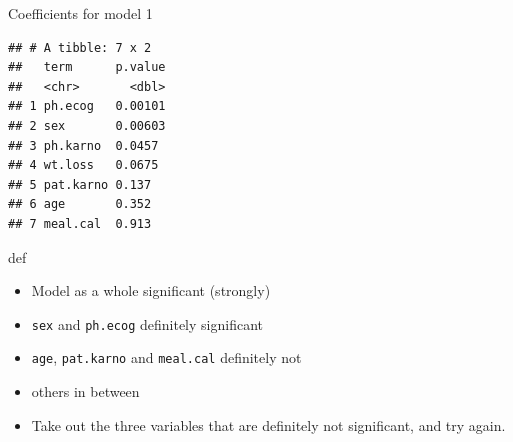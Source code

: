\documentclass[ignorenonframetext,]{beamer}
\newenvironment{Shaded}{\begin{snugshade}}{\end{snugshade}}
\newcommand{\FloatTok}[1]{\textcolor[rgb]{0.00,0.00,0.81}{#1}}
\newcommand{\KeywordTok}[1]{\textcolor[rgb]{0.13,0.29,0.53}{\textbf{#1}}}
\newcommand{\NormalTok}[1]{#1}
\newcommand{\OperatorTok}[1]{\textcolor[rgb]{0.81,0.36,0.00}{\textbf{#1}}}
\newcommand{\StringTok}[1]{\textcolor[rgb]{0.31,0.60,0.02}{#1}}
\begin{document}
\begin{frame}[fragile]{Coefficients for model 1}
\protect\hypertarget{coefficients-for-model-1}{}

\begin{Shaded}
\end{Shaded}

\begin{verbatim}
## # A tibble: 7 x 2
##   term      p.value
##   <chr>       <dbl>
## 1 ph.ecog   0.00101
## 2 sex       0.00603
## 3 ph.karno  0.0457 
## 4 wt.loss   0.0675 
## 5 pat.karno 0.137  
## 6 age       0.352  
## 7 meal.cal  0.913
\end{verbatim}

def

\begin{itemize}
\item
  Model as a whole significant (strongly)
\item
  \texttt{sex} and \texttt{ph.ecog} definitely significant
\item
  \texttt{age}, \texttt{pat.karno} and \texttt{meal.cal} definitely not
\item
  others in between
\item
  Take out the three variables that are definitely not significant, and
  try again.
\end{itemize}

\end{frame}
\end{document}
